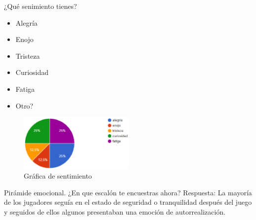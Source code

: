 	¿Qué senimiento tienes? 
	\begin{itemize}
		\item Alegría
		\item Enojo
		\item Tristeza
		\item Curiosidad
		\item Fatiga
		\item Otro?
	\end{itemize}

\begin{figure}
	\centering
	\caption{Gráfica de sentimiento}
	\label{fig:pos04}
	\includegraphics[width=0.5\textwidth]{04ResultadosObetnidos/pruebaR/imagenes/que/pos04}
\end{figure}



	Pirámide emocional. ¿En que escalón te encuestras ahora?
	Respuesta: La mayoría de los jugadores seguía en el estado de seguridad o tranquilidad después del juego y seguidos de ellos algunos presentaban una emoción de autorrealización.

